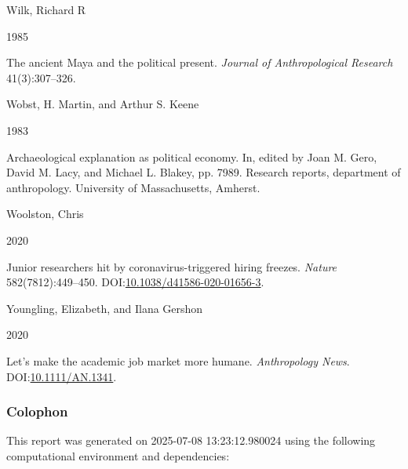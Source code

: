 \documentclass[
  12pt,
]{article}
\newlength{\cslhangindent}
\newlength{\csllabelwidth}
\newenvironment{CSLReferences}[2] %
 {\begin{list}{}{%
  \setlength{\itemindent}{0pt}
  \setlength{\leftmargin}{0pt}
  \setlength{\parsep}{0pt}
  \ifodd #1
   \setlength{\leftmargin}{\cslhangindent}
   \setlength{\itemindent}{-1\cslhangindent}
  \fi
  \setlength{\itemsep}{#2\baselineskip}}}
 {\end{list}}
\newcommand{\CSLBlock}[1]{\hfill\break\parbox[t]{\linewidth}{\strut\ignorespaces#1\strut}}
\newcommand{\CSLLeftMargin}[1]{\parbox[t]{\csllabelwidth}{\strut#1\strut}}
\newcommand{\CSLRightInline}[1]{\parbox[t]{\linewidth - \csllabelwidth}{\strut#1\strut}}
\begin{document}
\begin{CSLReferences}{0}{1}
\CSLBlock{Wilk, Richard R}
\CSLLeftMargin{ 1985}%
\CSLRightInline{The ancient {M}aya and the political present.
\emph{Journal of Anthropological Research} 41(3):307--326.}

\CSLBlock{Wobst, H. Martin, and Arthur S. Keene}
\CSLLeftMargin{ 1983}%
\CSLRightInline{Archaeological explanation as political economy. In,
edited by Joan M. Gero, David M. Lacy, and Michael L. Blakey, pp. 7989.
Research reports, department of anthropology. University of
Massachusetts, Amherst.}

\CSLBlock{Woolston, Chris}
\CSLLeftMargin{ 2020}%
\CSLRightInline{Junior researchers hit by coronavirus-triggered hiring
freezes. \emph{Nature} 582(7812):449--450.
DOI:\href{https://doi.org/10.1038/d41586-020-01656-3}{10.1038/d41586-020-01656-3}.}

\CSLBlock{Youngling, Elizabeth, and Ilana Gershon}
\CSLLeftMargin{ 2020}%
\CSLRightInline{Let's make the academic job market more humane.
\emph{Anthropology News}.
DOI:\href{https://doi.org/10.1111/AN.1341}{10.1111/AN.1341}.}

\end{CSLReferences}

\newpage

\subsubsection{Colophon}\label{colophon}

This report was generated on 2025-07-08 13:23:12.980024 using the
following computational environment and dependencies:
\end{document}
